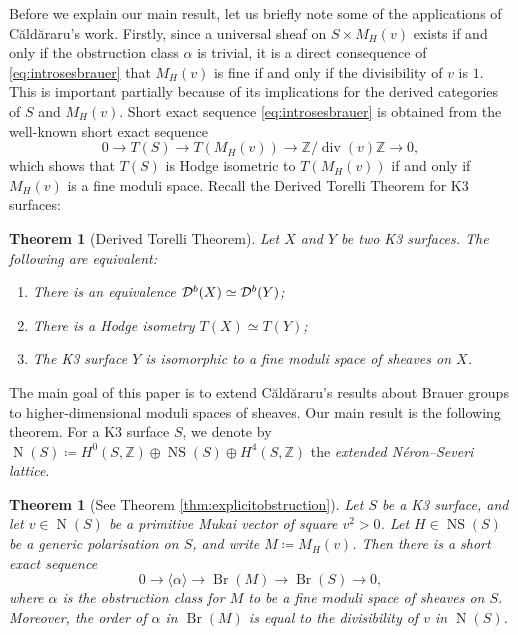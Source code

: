 \documentclass[11pt,twoside]{amsart}
\numberwithin{equation}{section}
\newtheorem{theorem}[dummy]{Theorem}
\theoremstyle{definition}
\theoremstyle{plain}
\newcommand{\Z}{\ensuremath{\mathbb{Z}}}
\def\Db{\calD^{b}}
\def\NS{\operatorname{NS}}
\def\Br{\operatorname{Br}}
\def\N{\operatorname{N}}
\def\dv{\operatorname{div}}
\begin{document}
Before we explain our main result, let us briefly note some of the applications of C\u ald\u araru's work. Firstly, since a universal sheaf on $S\times M_H(v)$ exists if and only if the obstruction class $\alpha$ is trivial, it is a direct consequence of \eqref{eq:introsesbrauer} that $M_H(v)$ is fine if and only if the divisibility of $v$ is $1$. This is important partially because of its implications for the derived categories of $S$ and $M_H(v)$. Short exact sequence \eqref{eq:introsesbrauer} is obtained from the well-known short exact sequence \cite[Proposition 6.4]{Muk87} 
\begin{equation}\label{eq:introsestranscendental}
    0\to T(S)\to T(M_H(v))\to \Z/\dv(v)\Z\to 0,
\end{equation}
which shows that $T(S)$ is Hodge isometric to $T(M_H(v))$ if and only if $M_H(v)$ is a fine moduli space. Recall the Derived Torelli Theorem for K3 surfaces:
\begin{theorem}[Derived Torelli Theorem]\cite{Muk87,Orl03} \label{thm:introderivedtorelli}
    Let $X$ and $Y$ be two K3 surfaces. The following are equivalent:
    \begin{enumerate}
        \item[i)] There is an equivalence $\Db(X)\simeq \Db(Y)$;
        \item[ii)] There is a Hodge isometry $T(X)\simeq T(Y)$;
        \item[iii)] The K3 surface $Y$ is isomorphic to a fine moduli space of sheaves on $X$.
    \end{enumerate}
\end{theorem}

The main goal of this paper is to extend C\u ald\u araru's results about Brauer groups to higher-dimensional moduli spaces of sheaves. Our main result is the following theorem. For a K3 surface $S$, we denote by $\N(S) \coloneqq H^0(S,\Z)\oplus \NS(S) \oplus H^4(S,\Z)$ the \textit{extended N\'eron--Severi lattice}.

\begin{theorem}[See Theorem \ref{thm:explicitobstruction}]\label{thm:introexplicitobstruction}
    Let $S$ be a K3 surface, and let $v\in \N(S)$ be a primitive Mukai vector of square $v^2>0$. Let $H\in \NS(S)$ be a generic polarisation on $S$, and write $M\coloneqq M_H(v)$. Then there is a short exact sequence $$0\to \langle\alpha\rangle\to \Br(M)\to \Br(S)\to 0,$$ where $\alpha$ is the obstruction class for $M$ to be a fine moduli space of sheaves on $S$. Moreover, the order of $\alpha$ in $\Br(M)$ is equal to the divisibility of $v$ in $\N(S)$. 
\end{theorem}
\end{document}
